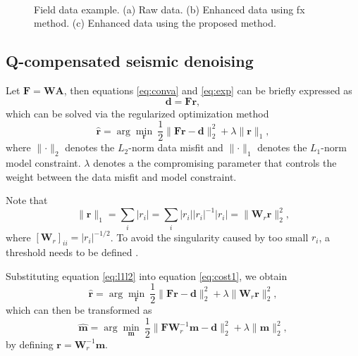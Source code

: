 \begin{figure}[htb!]
 \centering
 \\
  \caption{Field data example. (a) Raw data. (b) Enhanced data using fx method. (c) Enhanced data using the proposed method.}
  \label{fig:real-dn-0,real-d2-0,real-d1-0}
\end{figure}

\subsection{Q-compensated seismic denoising}
Let $\mathbf{F}=\mathbf{WA}$, then equations \ref{eq:conva} and \ref{eq:exp} can be briefly expressed as
\begin{equation}
\label{eq:inv}
\mathbf{d} = \mathbf{Fr},
\end{equation}
which can be solved via the regularized optimization method
\begin{equation}
\label{eq:cost1}
\hat{\mathbf{r}} = \arg \min_{\mathbf{r}} \ \frac{1}{2} \parallel \mathbf{F} \mathbf{r}-\mathbf{d}\parallel_2^2+ \lambda \parallel\mathbf{r}\parallel_1,
\end{equation}
where $\parallel\cdot \parallel_2$ denotes the $L_2$-norm data misfit and $\parallel\cdot \parallel_1$ denotes the $L_1$-norm model constraint. $\lambda$ denotes a the compromising parameter that controls the weight between the data misfit and model constraint. 

Note that 
\begin{equation}
\label{eq:l1l2}
\parallel \mathbf{r} \parallel_1 = \sum_{i} |r_i| =  \sum_{i} |r_i| |r_i|^{-1} |r_i| = \parallel \mathbf{W}_r\mathbf{r} \parallel_2^2,
\end{equation}
where $[\mathbf{W}_r]_{ii}=|r_i|^{-1/2}$. To avoid the singularity caused by too small $r_i$, a threshold needs to be defined \cite{amr2014}. 

Substituting equation \ref{eq:l1l2} into equation \ref{eq:cost1}, we obtain
\begin{equation}
\label{eq:cost2}
\hat{\mathbf{r}} = \arg \min_{\mathbf{r}} \ \frac{1}{2} \parallel \mathbf{F} \mathbf{r}-\mathbf{d}\parallel_2^2+ \lambda \parallel \mathbf{W}_r\mathbf{r} \parallel_2^2,
\end{equation}
which can then be transformed as
\begin{equation}
\label{eq:cost2}
\hat{\mathbf{m}} = \arg \min_{\mathbf{m}} \ \frac{1}{2} \parallel \mathbf{F} \mathbf{W}_r^{-1}\mathbf{m}-\mathbf{d}\parallel_2^2+ \lambda \parallel \mathbf{m} \parallel_2^2,
\end{equation}
by defining $\mathbf{r}=\mathbf{W}_r^{-1}\mathbf{m}$.

